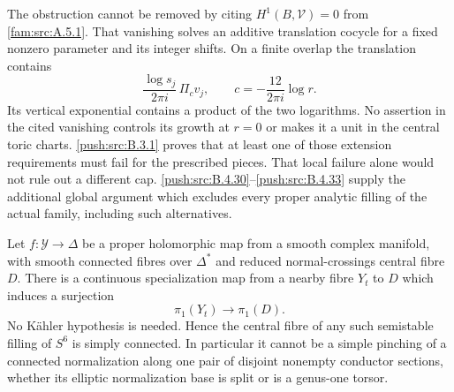The obstruction cannot be removed by citing
$H^1(B,\mathcal V)=0$ from \cref{fam:src:A.5.1}. That
vanishing solves an additive translation
cocycle for a fixed nonzero parameter and
its integer shifts. On a finite overlap
the translation contains
\[
 \frac{\log s_j}{2\pi i}\,\Pi_c v_j,
 \qquad c=-\frac{12}{2\pi i}\log r.
\]
Its vertical exponential contains a product
of the two logarithms. No assertion in
the cited vanishing controls its growth
at $r=0$ or makes it a unit in the central
toric charts. \ref{push:src:B.3.1} proves that at least
one of those extension requirements must
fail for the prescribed pieces. That local
failure alone would not rule out a different cap.
\ref{push:src:B.4.30}--\ref{push:src:B.4.33} supply the additional global argument
which excludes every proper analytic filling of
the actual family, including such alternatives.

\begin{theorem}\label{push:src:B.4.2}\label{push:B42}

Let $f:\mathcal Y\to\Delta$ be a
proper holomorphic map from a smooth
complex manifold, with smooth connected
fibres over $\Delta^*$ and reduced
normal-crossings central fibre $D$.
There is a continuous specialization
map from a nearby fibre $Y_t$ to $D$
which induces a surjection
\[
 \pi_1(Y_t)\longrightarrow\pi_1(D).
\]
No K\"ahler hypothesis is needed.
Hence the central fibre of any such
semistable filling of $S^6$ is simply
connected. In particular it cannot
be a simple pinching of a connected
normalization along one pair of
disjoint nonempty conductor sections,
whether its elliptic normalization
base is split or is a genus-one torsor.
\end{theorem}


